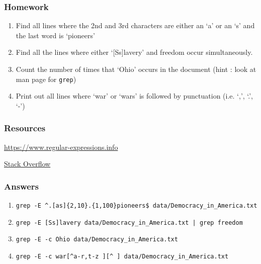 \documentclass{beamer}
\newcommand{\code}[1]{\colorbox{codegray}{\texttt{#1}}}
\begin{document}
\begin{frame}
\frametitle{Homework}
\begin{enumerate}
    \item Find all lines where the 2nd and 3rd characters are either an `a' or an `s' and the last word is `pioneers'
    \pause
    \item Find all the lines where either `[Ss]lavery' and freedom occur simultaneously.
    \pause
    \item Count the number of times that `Ohio' occurs in the document (hint : look at man page for \code{grep})
    \pause
    \item Print out all lines where `war' or `wars' is followed by punctuation (i.e. `,', `.', `-')
\end{enumerate}
\end{frame}





\begin{frame}
\frametitle{Resources}

\href{https://www.regular-expressions.info/}{https://www.regular-expressions.info}

\href{https://stackoverflow.com/}{Stack Overflow}

\end{frame}


\begin{frame}
\frametitle{Answers}
\scriptsize 
\begin{enumerate}
    \item \code{grep -E \^{}.[as]\{2,10\}.\{1,100\}pioneers\$ data/Democracy\_in\_America.txt}
    \pause
    \item \code{grep -E [Ss]lavery data/Democracy\_in\_America.txt  | grep freedom}
    \pause
    \item \code{grep -E -c Ohio data/Democracy\_in\_America.txt}
    \pause
    \item \code{grep -E -c war[\^{}a-r,t-z\ ][\^{}\ ] data/Democracy\_in\_America.txt}
\end{enumerate}
\end{frame}
\end{document}
